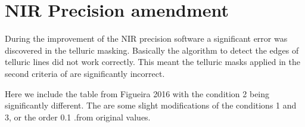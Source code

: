 
\chapter{NIR Precision amendment} %

\label{AppendixX} %

During the improvement of the NIR precision software a significant error was discovered in the telluric masking. Basically the algorithm to detect the edges of telluric lines did not work correctly. This meant the telluric masks applied in the second criteria of \citet{figueira_radial_2016} are significantly incorrect.

Here we include the table from Figueira 2016 with the condition 2 being significantly different. 
The are some slight modifications of the conditions 1 and 3, or the order 0.1 .from original values. 




%
%
% 


\DTLsetseparator{ }

